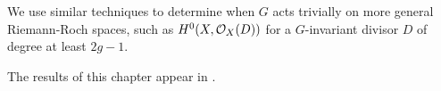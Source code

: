 We use similar techniques to determine when $G$ acts trivially on more general Riemann-Roch spaces, such as $H^0(X,{\cal O}_X(D))$ for a $G$-invariant divisor $D$ of degree at least $2g-1$.

The results of this chapter appear in \cite{faithfulaction}.



